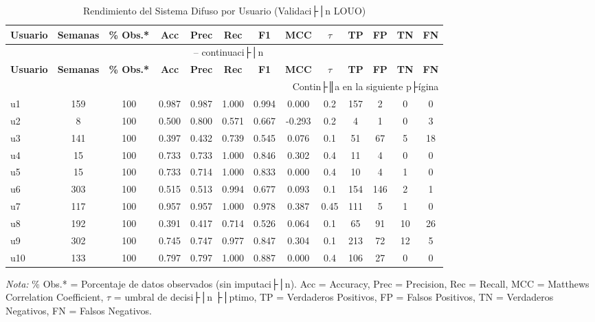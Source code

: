 \begin{longtable}{@{}lcccccccccccc@{}}
\caption{Rendimiento del Sistema Difuso por Usuario (Validaci├│n LOUO)}
\label{tab:rendimiento_loou} \\
\toprule
\textbf{Usuario} & \textbf{Semanas} & \textbf{\% Obs.*} & \textbf{Acc} & \textbf{Prec} & \textbf{Rec} & \textbf{F1} & \textbf{MCC} & \textbf{$\tau$} & \textbf{TP} & \textbf{FP} & \textbf{TN} & \textbf{FN} \\
\midrule
\endfirsthead
\multicolumn{13}{c}{\tablename\ \thetable{} -- continuaci├│n} \\
\toprule
\textbf{Usuario} & \textbf{Semanas} & \textbf{\% Obs.*} & \textbf{Acc} & \textbf{Prec} & \textbf{Rec} & \textbf{F1} & \textbf{MCC} & \textbf{$\tau$} & \textbf{TP} & \textbf{FP} & \textbf{TN} & \textbf{FN} \\
\midrule
\endhead
\midrule
\multicolumn{13}{r}{Contin├║a en la siguiente p├ígina} \\
\endfoot
\bottomrule
\endlastfoot
u1  & 159 & 100 & 0.987 & 0.987 & 1.000 & 0.994 & 0.000 & 0.2 & 157 & 2   & 0  & 0 \\
u2  & 8   & 100 & 0.500 & 0.800 & 0.571 & 0.667 & -0.293 & 0.2 & 4   & 1   & 0  & 3 \\
u3  & 141 & 100 & 0.397 & 0.432 & 0.739 & 0.545 & 0.076 & 0.1 & 51  & 67  & 5  & 18 \\
u4  & 15  & 100 & 0.733 & 0.733 & 1.000 & 0.846 & 0.302 & 0.4 & 11  & 4   & 0  & 0 \\
u5  & 15  & 100 & 0.733 & 0.714 & 1.000 & 0.833 & 0.000 & 0.4 & 10  & 4   & 1  & 0 \\
u6  & 303 & 100 & 0.515 & 0.513 & 0.994 & 0.677 & 0.093 & 0.1 & 154 & 146 & 2  & 1 \\
u7  & 117 & 100 & 0.957 & 0.957 & 1.000 & 0.978 & 0.387 & 0.45 & 111 & 5   & 1  & 0 \\
u8  & 192 & 100 & 0.391 & 0.417 & 0.714 & 0.526 & 0.064 & 0.1 & 65  & 91  & 10 & 26 \\
u9  & 302 & 100 & 0.745 & 0.747 & 0.977 & 0.847 & 0.304 & 0.1 & 213 & 72  & 12 & 5 \\
u10 & 133 & 100 & 0.797 & 0.797 & 1.000 & 0.887 & 0.000 & 0.4 & 106 & 27  & 0  & 0 \\
\end{longtable}

\begin{flushleft}
\small
\textit{Nota:} \% Obs.* = Porcentaje de datos observados (sin imputaci├│n). Acc = Accuracy, Prec = Precision, Rec = Recall, MCC = Matthews Correlation Coefficient, $\tau$ = umbral de decisi├│n ├│ptimo, TP = Verdaderos Positivos, FP = Falsos Positivos, TN = Verdaderos Negativos, FN = Falsos Negativos.
\end{flushleft}


